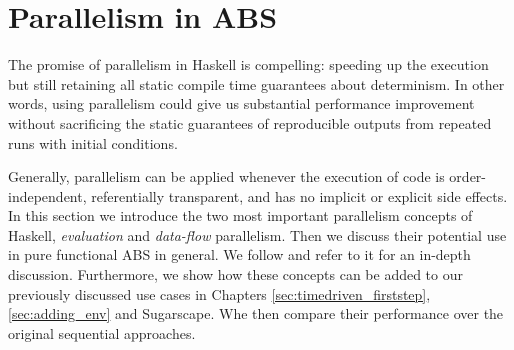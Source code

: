 \chapter{Parallelism in ABS}
\label{ch:parallelism_ABS}
The promise of parallelism in Haskell is compelling: speeding up the execution but still retaining all static compile time guarantees about determinism. In other words, using parallelism could give us substantial performance improvement without sacrificing the static guarantees of reproducible outputs from repeated runs with initial conditions.

Generally, parallelism can be applied whenever the execution of code is order-independent, referentially transparent, and has no implicit or explicit side effects. In this section we introduce the two most important parallelism concepts of Haskell, \textit{evaluation} and \textit{data-flow} parallelism. Then we discuss their potential use in pure functional ABS in general. We follow \cite{marlow_parallel_2013} and refer to it for an in-depth discussion. Furthermore, we show how these concepts can be added to our previously discussed use cases in Chapters \ref{sec:timedriven_firststep}, \ref{sec:adding_env} and Sugarscape. Whe then compare their performance over the original sequential approaches.





%
%




